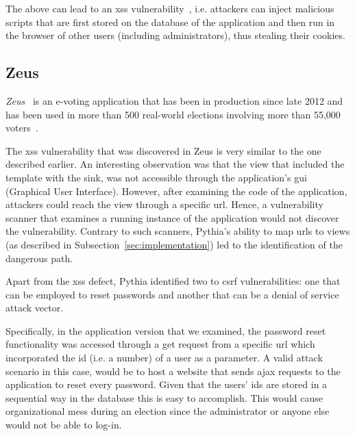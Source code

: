 \noindent
The above can lead to an {\sc xss} vulnerability~\cite{MLPK17},
i.e. attackers can inject malicious scripts
that are first stored on the database
of the application
and then run in the browser of other users
(including administrators),
thus stealing their cookies.


\subsection{Zeus}
\label{sec:zeus}

{\it Zeus}~\cite{zeus-jets, zeus}
is an e-voting application
that has been in production
since late 2012 and
has been used in more than 500
real-world elections involving
more than 55,000 voters~\cite{pnrmx-del}.

The {\sc xss} vulnerability
that was discovered in Zeus is very
similar to the one described earlier.
An interesting observation
was that the view that included
the template with the sink,
was not accessible through the
application's
{\sc gui} (Graphical User Interface).
However,
after examining the code of the application,
attackers could reach the view through
a specific {\sc url}.
Hence,
a vulnerability scanner that examines
a running instance of the application
would not discover the vulnerability.
Contrary to such scanners,
Pythia's
ability to map {\sc url}s to views
(as described in
Subsection~\ref{sec:implementation})
led to the identification of the
dangerous path.

Apart from the {\sc xss} defect,
Pythia identified two
to {\sc csrf} vulnerabilities:
one that can be employed to reset
passwords and another that
can be a denial of service attack vector.

Specifically,
in the application version that we examined,
the password reset functionality was
accessed through a {\sc get} request from
a specific {\sc url} which incorporated
the {\sc id} (i.e. a number) of a user
as a parameter.
A valid attack scenario in this case,
would be to host a website that sends
{\sc ajax} requests to the application
to reset every password.
Given that the users' {\sc id}s
are stored in a sequential way
in the database this is easy to accomplish.
This would cause organizational mess
during an election since the administrator
or anyone else would not be able to log-in.

